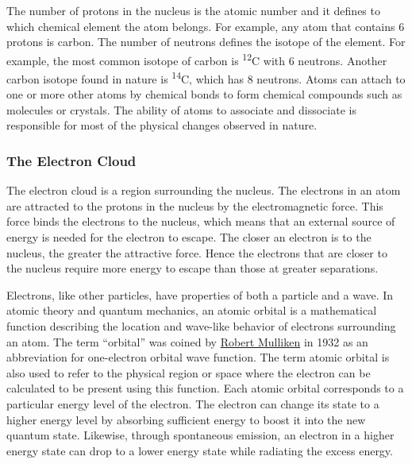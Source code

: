 The number of protons in the nucleus is the atomic number and it defines
to which chemical element the atom belongs. For example, any atom that
contains 6 protons is carbon. The number of neutrons defines the isotope
of the element. For example, the most common isotope of carbon is
\textsuperscript{12}C with 6 neutrons. Another carbon isotope found in
nature is \textsuperscript{14}C, which has 8 neutrons. Atoms can attach
to one or more other atoms by chemical bonds to form chemical compounds
such as molecules or crystals. The ability of atoms to associate and
dissociate is responsible for most of the physical changes observed in
nature.

\hypertarget{the-electron-cloud}{%
\subsubsection{The Electron Cloud}\label{the-electron-cloud}}

The electron cloud is a region surrounding the nucleus. The electrons in
an atom are attracted to the protons in the nucleus by the
electromagnetic force. This force binds the electrons to the nucleus,
which means that an external source of energy is needed for the electron
to escape. The closer an electron is to the nucleus, the greater the
attractive force. Hence the electrons that are closer to the nucleus
require more energy to escape than those at greater separations.

Electrons, like other particles, have properties of both a particle and
a wave. In atomic theory and quantum mechanics, an atomic orbital is a
mathematical function describing the location and wave-like behavior of
electrons surrounding an atom. The term ``orbital'' was coined by
\href{https://en.wikipedia.org/wiki/Robert_S._Mulliken}{Robert Mulliken}
in 1932 as an abbreviation for one-electron orbital wave function. The
term atomic orbital is also used to refer to the physical region or
space where the electron can be calculated to be present using this
function. Each atomic orbital corresponds to a particular energy level
of the electron. The electron can change its state to a higher energy
level by absorbing sufficient energy to boost it into the new quantum
state. Likewise, through spontaneous emission, an electron in a higher
energy state can drop to a lower energy state while radiating the excess
energy.

